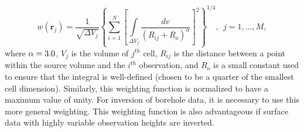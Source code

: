 \begin{equation}
\label{eq:distw}
w(\mathbf{r}_j)=\frac{1}{\sqrt{\Delta V_{j}}} \left\{\sum_{i=1}^{N}\left[\int\limits_{\Delta V_{j}}\frac{dv}{(R_{ij}+R_o)^\alpha}\right]^{2}\right\}^{1/4}, ~~j=1,...,M,
\end{equation}
%
where $\alpha=3.0$, $V_j$ is the volume of $j^{th}$ cell, $R_{ij}$ is the distance between a point within the source volume and the $i^{th}$ observation, and $R_o$ is a small constant used to ensure that the integral is well-defined (chosen to be a quarter of the smallest cell dimension). Similarly, this weighting function is normalized to have a maximum value of unity. For inversion of borehole data, it is necessary to use this more general weighting. This weighting function is also advantageous if surface data with highly variable observation heights are inverted.